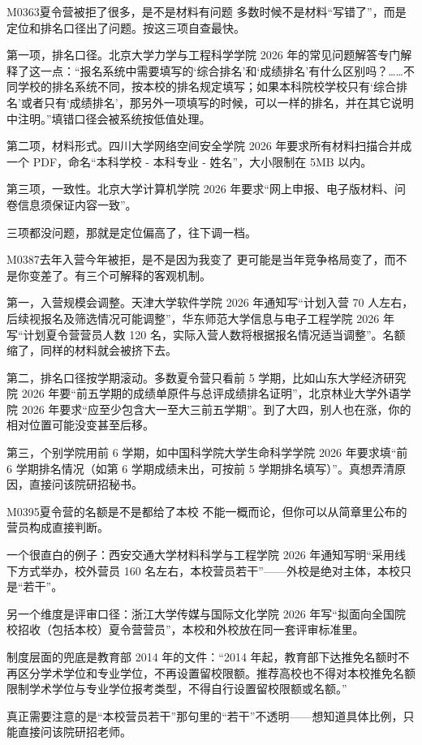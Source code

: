 \begin{qa}{M0363}{夏令营被拒了很多，是不是材料有问题}
多数时候不是材料“写错了”，而是定位和排名口径出了问题。按这三项自查最快。

第一项，排名口径。北京大学力学与工程科学学院 2026 年的常见问题解答专门解释了这一点：“报名系统中需要填写的‘综合排名’和‘成绩排名’有什么区别吗？……不同学校的排名系统不同，按本校的排名规定填写；如果本科院校学校只有‘综合排名’或者只有‘成绩排名’，那另外一项填写的时候，可以一样的排名，并在其它说明中注明。”填错口径会被系统按低值处理。

第二项，材料形式。四川大学网络空间安全学院 2026 年要求所有材料扫描合并成一个 PDF，命名“本科学校 - 本科专业 - 姓名”，大小限制在 5MB 以内。

第三项，一致性。北京大学计算机学院 2026 年要求“网上申报、电子版材料、问卷信息须保证内容一致”。

三项都没问题，那就是定位偏高了，往下调一档。
\end{qa}

\begin{qa}{M0387}{去年入营今年被拒，是不是因为我变了}
更可能是当年竞争格局变了，而不是你变差了。有三个可解释的客观机制。

第一，入营规模会调整。天津大学软件学院 2026 年通知写“计划入营 70 人左右，后续视报名及筛选情况可能调整”，华东师范大学信息与电子工程学院 2026 年写“计划夏令营营员人数 120 名，实际入营人数将根据报名情况适当调整”。名额缩了，同样的材料就会被挤下去。

第二，排名口径按学期滚动。多数夏令营只看前 5 学期，比如山东大学经济研究院 2026 年要“前五学期的成绩单原件与总评成绩排名证明”，北京林业大学外语学院 2026 年要求“应至少包含大一至大三前五学期”。到了大四，别人也在涨，你的相对位置可能没变甚至后移。

第三，个别学院用前 6 学期，如中国科学院大学生命科学学院 2026 年要求填“前 6 学期排名情况（如第 6 学期成绩未出，可按前 5 学期排名填写）”。真想弄清原因，直接问该院研招秘书。
\end{qa}

\begin{qa}{M0395}{夏令营的名额是不是都给了本校}
不能一概而论，但你可以从简章里公布的营员构成直接判断。

一个很直白的例子：西安交通大学材料科学与工程学院 2026 年通知写明“采用线下方式举办，校外营员 160 名左右，本校营员若干”——外校是绝对主体，本校只是“若干”。

另一个维度是评审口径：浙江大学传媒与国际文化学院 2026 年写“拟面向全国院校招收（包括本校）夏令营营员”，本校和外校放在同一套评审标准里。

制度层面的兜底是教育部 2014 年的文件：“2014 年起，教育部下达推免名额时不再区分学术学位和专业学位，不再设置留校限额。推荐高校也不得对本校推免名额限制学术学位与专业学位报考类型，不得自行设置留校限额或名额。”

真正需要注意的是“本校营员若干”那句里的“若干”不透明——想知道具体比例，只能直接问该院研招老师。
\end{qa}

